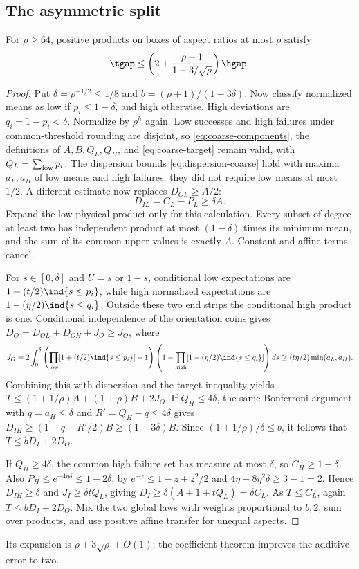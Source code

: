 \subsection{The asymmetric split}
\begin{proposition}\label{prop:asymmetric-box}
For $\rho\ge64$, positive products on boxes of aspect ratios at most
$\rho$ satisfy
\[
 \tgap\le\left(2+\frac{\rho+1}{1-3/\sqrt\rho}\right)\hgap.
\]
\end{proposition}
\begin{proof}
Put $\delta=\rho^{-1/2}\le1/8$ and $b=(\rho+1)/(1-3\delta)$.
Now classify normalized means as low if $p_i\le1-\delta$, and high
otherwise. High deviations are $q_i=1-p_i<\delta$. Normalize by
$\rho^h$ again. Low successes and high failures under common-threshold
rounding are disjoint, so \eqref{eq:coarse-components}, the definitions
of $A,B,Q_L,Q_H$, and \eqref{eq:coarse-target} remain valid, with
$Q_L=\sum_{\rm low}p_i$. The dispersion bounds
\eqref{eq:dispersion-coarse} hold with maxima $a_L,a_H$ of low means
and high failures; they did not require low means at most $1/2$.
A different estimate now replaces $D_{OL}\ge A/2$:
\[
 D_{IL}=C_L-P_L\ge\delta A.
\]
Expand the low physical product only for this calculation. Every
subset of degree at least two has independent product at most
$(1-\delta)$ times its minimum mean, and the sum of its common upper
values is exactly $A$. Constant and affine terms cancel.

For $s\in[0,\delta]$ and $U=s$ or $1-s$, conditional low expectations
are $1+(t/2)\ind\{s\le p_i\}$, while high normalized expectations
are $1-(\eta/2)\ind\{s\le q_i\}$. Outside these two end strips
the conditional high product is one. Conditional independence of the
orientation coins gives $D_O=D_{OL}+D_{OH}+J_O\ge J_O$, where
\[
 J_O=2\int_0^\delta
 \left(\prod_{\rm low}[1+(t/2)\ind\{s\le p_i\}]-1\right)
 \left(1-\prod_{\rm high}[1-(\eta/2)\ind\{s\le q_i\}]\right)ds
 \ge(t\eta/2)\min(a_L,a_H).
\]
Combining this with dispersion and the target inequality yields
$T\le(1+1/\rho)A+(1+\rho)B+2J_O$.
If $Q_H\le4\delta$, the same Bonferroni argument with $q=a_H\le\delta$
and $R'=Q_H-q\le4\delta$ gives
$D_{IH}\ge(1-q-R'/2)B\ge(1-3\delta)B$.
Since $(1+1/\rho)/\delta\le b$, it follows that
$T\le bD_I+2D_O$.

If $Q_H\ge4\delta$, the common high failure set has measure at most
$\delta$, so $C_H\ge1-\delta$. Also
$P_H\le e^{-4\eta\delta}\le1-2\delta$, by
$e^{-z}\le1-z+z^2/2$ and $4\eta-8\eta^2\delta\ge3-1=2$.
Hence $D_{IH}\ge\delta$ and $J_I\ge\delta tQ_L$, giving
$D_I\ge\delta(A+1+tQ_L)=\delta C_L$.
As $T\le C_L$, again $T\le bD_I+2D_O$.
Mix the two global laws with weights proportional to $b,2$, sum over
products, and use positive affine transfer for unequal aspects.
\end{proof}
Its expansion is $\rho+3\sqrt\rho+O(1)$; the coefficient theorem
improves the additive error to two.

